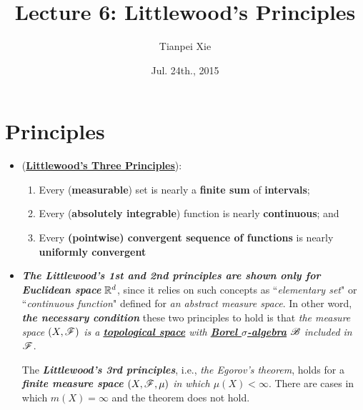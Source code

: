 \documentclass[11pt]{article}
\begin{document}
\title{Lecture 6: Littlewood's Principles}
\author{ Tianpei Xie}
\date{ Jul. 24th., 2015 }
\maketitle
\tableofcontents
\newpage
\section{Principles}
\begin{itemize}
\item \begin{proposition} (\underline{\textbf{Littlewood's Three Principles}})\citep{royden1988real, tao2011introduction}:
\begin{enumerate}
\item Every (\textbf{measurable}) set is nearly a \textbf{finite sum} of \textbf{intervals};
\item Every (\textbf{absolutely integrable}) function is nearly \textbf{continuous};
and
\item Every \textbf{(pointwise) convergent sequence of functions} is nearly \textbf{uniformly convergent}
\end{enumerate}
\end{proposition}

\item  \begin{remark} \emph{\textbf{The Littlewood's 1st and 2nd principles are shown only for Euclidean space}} ${\mathbb R}^{d}$, since it relies on such  concepts as ``\emph{elementary set}" or ``\emph{continuous function}" defined for \emph{an abstract measure space}. In other word, \emph{\textbf{the necessary condition}} these two principles to hold is that \emph{the measure space $(X, {\mathscr F})$ is a \underline{\textbf{topological space}} with \underline{\textbf{Borel $\sigma$-algebra}} ${\mathscr B}$ included in ${\mathscr F}$}. 

The \emph{\textbf{Littlewood's 3rd principles}}, i.e., \emph{the Egorov's theorem}, holds for a \emph{\textbf{finite measure space} $(X, {\mathscr F}, \mu)$ in which $\mu(X)<\infty$}. There are cases in which $m(X)=\infty$ and the theorem does not hold. \citep{tao2011introduction}
\end{remark}
\end{itemize}
\end{document}
